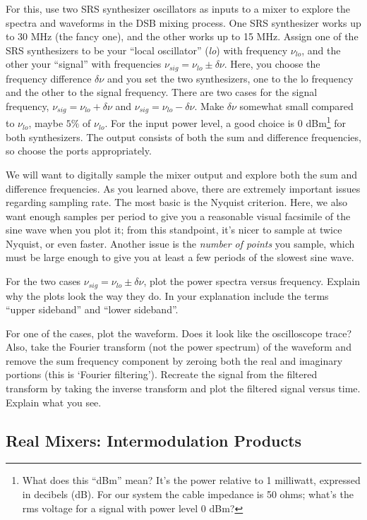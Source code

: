 \documentclass[12pt,preprint]{aastex}
\begin{document}
For this, use two SRS synthesizer oscillators as inputs to a mixer to
explore the spectra and waveforms in the DSB mixing process.  One SRS
synthesizer works up to 30 MHz (the fancy one), and the other works up
to 15 MHz.  Assign one of the SRS synthesizers to
be your ``local oscillator'' ({\it lo}) with frequency $\nu_{lo}$, and
the other your ``signal'' with frequencies $\nu_{sig} = \nu_{lo} \pm
\delta \nu$.  Here, you choose the frequency difference $\delta \nu$ and
you set the two synthesizers, one to the lo frequency and the other to
the signal frequency. There are two cases for the signal frequency,
$\nu_{sig} = \nu_{lo} + \delta \nu$ and $\nu_{sig} = \nu_{lo} - \delta
\nu$.  Make $\delta \nu$ somewhat small compared to $\nu_{lo}$, maybe
$5\%$ of $\nu_{lo}$.  For the input power level, a good choice is 0
dBm\footnote{What does this ``dBm'' mean? It's the power relative to 1
  milliwatt, expressed in decibels (dB). For our system the cable
  impedance is 50 ohms; what's the rms voltage for a signal with power
  level 0 dBm?} for both synthesizers. The output consists of both the
sum and difference frequencies, so choose the ports appropriately.

We will want to digitally sample the mixer output and explore both the
sum and difference frequencies. As you learned above, there are
extremely important issues regarding sampling rate. The most basic is
the Nyquist criterion. Here, we also want enough samples per period to
give you a reasonable visual facsimile of the sine wave when you plot
it; from this standpoint, it's nicer to sample at twice
Nyquist, or even faster.  Another issue is the {\it number of points}
you sample, which must be large enough to give you at least a few
periods of the slowest sine wave.

For the two cases $\nu_{sig} = \nu_{lo} \pm \delta \nu$, plot the power
spectra versus frequency. Explain why the plots look the way they do. In
your explanation include the terms ``upper sideband'' and ``lower
sideband''.

For one of the cases, plot the waveform.  Does it look like the
oscilloscope trace? Also, take the Fourier transform (not the power
spectrum) of the waveform and remove the sum frequency component by
zeroing both the real and imaginary portions (this is `Fourier
filtering').  Recreate the signal from the filtered transform by taking
the inverse transform and plot the filtered signal versus time.  Explain
what you see.

\subsection{Real Mixers: Intermodulation Products}
\end{document}
